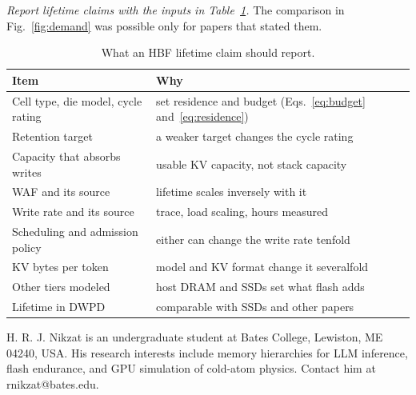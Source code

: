 \documentclass[journal]{IEEEtran}
\begin{document}
\emph{Report lifetime claims with the inputs in Table~\ref{tab:checklist}.} The comparison in Fig.~\ref{fig:demand} was possible only for papers that stated them.

\begin{table}[t]
\caption{What an HBF lifetime claim should report.}
\label{tab:checklist}
\centering\footnotesize
\begin{tabular}{@{}>{\raggedright\arraybackslash}p{2.6cm}>{\raggedright\arraybackslash}p{5.1cm}@{}}
\toprule
Item & Why \\
\midrule
Cell type, die model, cycle rating & set residence and budget (Eqs.~\ref{eq:budget} and~\ref{eq:residence}) \\
Retention target & a weaker target changes the cycle rating \\
Capacity that absorbs writes & usable KV capacity, not stack capacity \\
WAF and its source & lifetime scales inversely with it \\
Write rate and its source & trace, load scaling, hours measured \\
Scheduling and admission policy & either can change the write rate tenfold \\
KV bytes per token & model and KV format change it severalfold \\
Other tiers modeled & host DRAM and SSDs set what flash adds \\
Lifetime in DWPD & comparable with SSDs and other papers \\
\bottomrule
\end{tabular}
\end{table}




\begin{IEEEbiographynophoto}{H. R. J. Nikzat}
is an undergraduate student at Bates College, Lewiston, ME 04240, USA. His research interests include memory hierarchies for LLM inference, flash endurance, and GPU simulation of cold-atom physics. Contact him at rnikzat@bates.edu.
\end{IEEEbiographynophoto}
\end{document}
